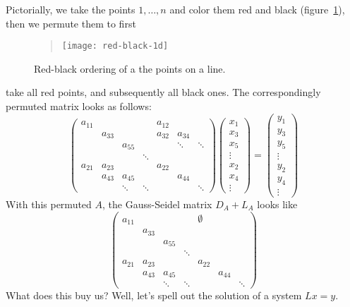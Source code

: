 Pictorially, we take the points $1,\ldots,n$ and color them red and
black (figure~\ref{fig:red-black-1d}), then we permute them to first
\begin{figure}
  \begin{quote}
    \texttt{[image: red-black-1d]}
  \end{quote}
  \caption{Red-black ordering of a the points on a line.}
  \label{fig:red-black-1d}
\end{figure}
take all red points, and subsequently all black ones.
The correspondingly permuted matrix looks as follows:
\[ 
\begin{pmatrix}
  a_{11}&&&&a_{12}\\ &a_{33}&&&a_{32}&a_{34}\\ &&a_{55}&&&\ddots&\ddots\\
  &&&\ddots\\
  a_{21}&a_{23}&&&a_{22}\\ &a_{43}&a_{45}&&&a_{44}\\ &&\ddots&\ddots&&&\ddots
\end{pmatrix}
\begin{pmatrix}  x_1\\ x_3\\ x_5\\ \vdots\\ x_2\\ x_4\\ \vdots\end{pmatrix} =
\begin{pmatrix}  y_1\\ y_3\\ y_5\\ \vdots\\ y_2\\ y_4\\ \vdots\end{pmatrix}
\]
With this permuted $A$, the Gauss-Seidel matrix $D_A+L_A$ looks like
\[ 
\begin{pmatrix}
  a_{11}&&&&\emptyset\\ &a_{33}\\ &&a_{55}\\
  &&&\ddots\\
  a_{21}&a_{23}&&&a_{22}\\ &a_{43}&a_{45}&&&a_{44}\\ &&\ddots&\ddots&&&\ddots
\end{pmatrix}
\]
What does this buy us? Well, let's spell out the solution of a system
$Lx=y$.

\begin{displayalgorithm}
\end{displayalgorithm}

